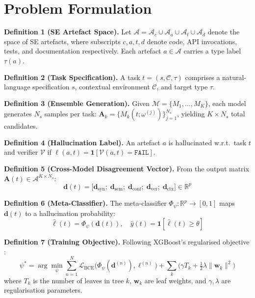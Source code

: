 \documentclass{svproc}
\begin{document}
\section{Problem Formulation}\label{sec:formulation}

\noindent\textbf{Definition 1 (SE Artefact Space).} Let $\mathcal{A} = \mathcal{A}_c \cup \mathcal{A}_a \cup \mathcal{A}_t \cup \mathcal{A}_d$ denote the space of SE artefacts, where subscripts $c, a, t, d$ denote code, API invocations, tests, and documentation respectively. Each artefact $a \in \mathcal{A}$ carries a type label $\tau(a)$.

\noindent\textbf{Definition 2 (Task Specification).} A task $t = (s, \mathcal{C}, \tau)$ comprises a natural-language specification $s$, contextual environment $\mathcal{C}$, and target type $\tau$.

\noindent\textbf{Definition 3 (Ensemble Generation).} Given $\mathcal{M} = \{M_1, \ldots, M_K\}$, each model generates $N_s$ samples per task: $\mathbf{A}_k = \{M_k(t; \omega^{(j)})\}_{j=1}^{N_s}$, yielding $K \times N_s$ total candidates.

\noindent\textbf{Definition 4 (Hallucination Label).} An artefact $a$ is hallucinated w.r.t.\ task $t$ and verifier $\mathcal{V}$ if $\ell(a,t) = \mathbf{1}[\mathcal{V}(a,t) = \texttt{FAIL}]$.

\noindent\textbf{Definition 5 (Cross-Model Disagreement Vector).} From the output matrix $\mathbf{A}(t) \in \mathcal{A}^{K \times N_s}$:
\begin{equation}
\mathbf{d}(t) = \bigl[\mathbf{d}_{\mathrm{syn}};\; \mathbf{d}_{\mathrm{sem}};\; \mathbf{d}_{\mathrm{conf}};\; \mathbf{d}_{\mathrm{ver}};\; \mathbf{d}_{\mathrm{ctx}}\bigr] \in \mathbb{R}^{p}
\label{eq:feature_vector}
\end{equation}

\noindent\textbf{Definition 6 (Meta-Classifier).} The meta-classifier $\Phi_\psi: \mathbb{R}^p \to [0,1]$ maps $\mathbf{d}(t)$ to a hallucination probability:
\begin{equation}
\hat{\ell}(t) = \Phi_\psi(\mathbf{d}(t)), \quad \hat{y}(t) = \mathbf{1}[\hat{\ell}(t) \geq \theta]
\end{equation}

\noindent\textbf{Definition 7 (Training Objective).} Following XGBoost's regularised objective \cite{chen2016xgboost}:
\begin{equation}
\psi^* = \arg\min_\psi \sum_{n=1}^{N} \mathcal{L}_{\mathrm{BCE}}\!\bigl(\Phi_\psi(\mathbf{d}^{(n)}), \ell^{(n)}\bigr) + \sum_{k} \bigl(\gamma T_k + \tfrac{1}{2}\lambda\|\mathbf{w}_k\|^2\bigr)
\label{eq:objective}
\end{equation}
where $T_k$ is the number of leaves in tree $k$, $\mathbf{w}_k$ are leaf weights, and $\gamma, \lambda$ are regularisation parameters.
\end{document}
